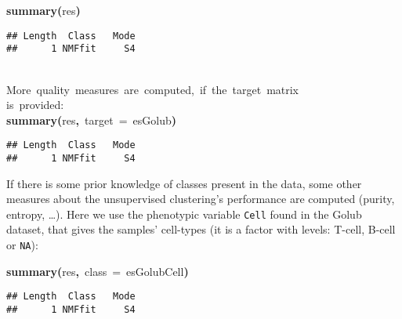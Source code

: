 \documentclass[a4paper]{article}\usepackage{graphicx, color}
\makeatletter
\newcommand{\hlfunctioncall}[1]{\textcolor[rgb]{0.501960784313725,0,0.329411764705882}{\textbf{#1}}}%
\newcommand{\hlkeyword}[1]{\textcolor[rgb]{0,0,0}{\textbf{#1}}}%
\newcommand{\hlargument}[1]{\textcolor[rgb]{0.690196078431373,0.250980392156863,0.0196078431372549}{#1}}%
\newcommand{\hlcomment}[1]{\textcolor[rgb]{0.180392156862745,0.6,0.341176470588235}{#1}}%
\newcommand{\hlsymbol}[1]{\textcolor[rgb]{0,0,0}{#1}}%
\newcommand{\hlstd}[1]{\textcolor[rgb]{0,0,0}{#1}}%
\newenvironment{kframe}{%
 \def\FrameCommand##1{\hskip\@totalleftmargin \hskip-\fboxsep
 \colorbox{shadecolor}{##1}\hskip-\fboxsep
     \hskip-\linewidth \hskip-\@totalleftmargin \hskip\columnwidth}%
 \MakeFramed {\advance\hsize-\width
   \@totalleftmargin\z@ \linewidth\hsize
   \@setminipage}}%
 {\par\unskip\endMakeFramed}
\newenvironment{knitrout}{}{} %
\let\code=\texttt
\makeatother
\begin{document}
\begin{knitrout}
\color{fgcolor}\begin{kframe}
\begin{flushleft}
\ttfamily\noindent
\hlfunctioncall{summary}\hlkeyword{(}\hlsymbol{res}\hlkeyword{)}\mbox{}
\normalfont
\end{flushleft}
\begin{verbatim}
## Length  Class   Mode 
##      1 NMFfit     S4 
\end{verbatim}
\begin{flushleft}
\ttfamily\noindent
\hspace*{\fill}\\
\hlstd{}\hlcomment{\usebox{\hlnormalsizeboxhash}{\ }More{\ }quality{\ }measures{\ }are{\ }computed,{\ }if{\ }the{\ }target{\ }matrix}\hspace*{\fill}\\
\hlstd{}\hlcomment{\usebox{\hlnormalsizeboxhash}{\ }is{\ }provided:}\hspace*{\fill}\\
\hlstd{}\hlfunctioncall{summary}\hlkeyword{(}\hlsymbol{res}\hlkeyword{,}{\ }\hlargument{target}{\ }\hlargument{=}{\ }\hlsymbol{esGolub}\hlkeyword{)}\mbox{}
\normalfont
\end{flushleft}
\begin{verbatim}
## Length  Class   Mode 
##      1 NMFfit     S4 
\end{verbatim}
\end{kframe}
\end{knitrout}


If there is some prior knowledge of classes present in the data, some other measures about the unsupervised clustering's performance are computed (purity, entropy, \ldots).
Here we use the phenotypic variable \code{Cell} found in the Golub dataset, that gives the samples' cell-types (it is a factor with levels: T-cell, B-cell or \code{NA}):

\begin{knitrout}
\color{fgcolor}\begin{kframe}
\begin{flushleft}
\ttfamily\noindent
\hlfunctioncall{summary}\hlkeyword{(}\hlsymbol{res}\hlkeyword{,}{\ }\hlargument{class}{\ }\hlargument{=}{\ }\hlsymbol{esGolub}\hlkeyword{\usebox{\hlnormalsizeboxdollar}}\hlsymbol{Cell}\hlkeyword{)}\mbox{}
\normalfont
\end{flushleft}
\begin{verbatim}
## Length  Class   Mode 
##      1 NMFfit     S4 
\end{verbatim}
\end{kframe}
\end{knitrout}
\end{document}
